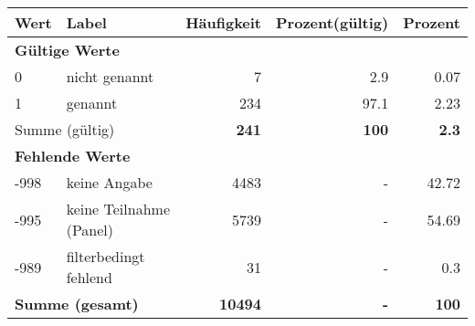      \begin{longtable}{lXrrr}
     \toprule
     \textbf{Wert} & \textbf{Label} & \textbf{Häufigkeit} & \textbf{Prozent(gültig)} & \textbf{Prozent} \\
     \endhead
     \midrule
     \multicolumn{5}{l}{\textbf{Gültige Werte}}\\

     0 &
     \multicolumn{1}{X}{ nicht genannt   } &


       \num{7} &
       \num[round-mode=places,round-precision=2]{2.9} &
         \num[round-mode=places,round-precision=2]{0.07} \\

     1 &
     \multicolumn{1}{X}{ genannt   } &


       \num{234} &
       \num[round-mode=places,round-precision=2]{97.1} &
         \num[round-mode=places,round-precision=2]{2.23} \\
     \midrule
     \multicolumn{2}{l}{Summe (gültig)} &
       \textbf{\num{241}} &
     \textbf{\num{100}} &
       \textbf{\num[round-mode=places,round-precision=2]{2.3}} \\
     \multicolumn{5}{l}{\textbf{Fehlende Werte}}\\
       -998 &
       keine Angabe &
         \num{4483} &
        - &
         \num[round-mode=places,round-precision=2]{42.72} \\
       -995 &
       keine Teilnahme (Panel) &
         \num{5739} &
        - &
         \num[round-mode=places,round-precision=2]{54.69} \\
       -989 &
       filterbedingt fehlend &
         \num{31} &
        - &
         \num[round-mode=places,round-precision=2]{0.3} \\
     \midrule
     \multicolumn{2}{l}{\textbf{Summe (gesamt)}} &
          \textbf{\num{10494}} &
        \textbf{-} &
        \textbf{\num{100}} \\
     \bottomrule
     \end{longtable}
     
